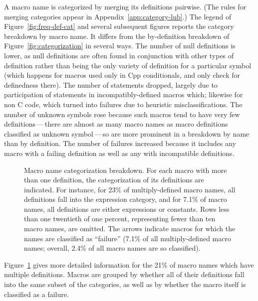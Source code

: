 \documentclass[10pt]{article}
\newcommand{\captionsmall}[1]{\caption[]{\small #1}}
\begin{document}
A macro name is categorized by merging its definitions pairwise.  (The
rules for merging categories appear in Appendix~\ref{app:category-lub}.)
The legend of Figure~\ref{fig:freq-def-cat} and several subsequent figures
reports the category breakdown by macro name.  It differs from the
by-definition breakdown of Figure~\ref{fig:categorization} in several ways.
The number of null definitions is lower, as null definitions are often
found in conjunction with other types of definition rather than being the
only variety of definition for a particular symbol (which happens for
macros used only in Cpp conditionals, and only check for definedness
there).  The number of statements dropped, largely due to participation of
statements in incompatibly-defined macros which; likewise for non C code,
which turned into failures due to heuristic misclassifications.  The number
of unknown symbols rose because such macros tend to have very few
definitions\,---\,there are almost as many macro names as macro definitions
classified as unknown symbol\,---\,so are more prominent in a breakdown by
name than by definition.  The number of failures increased because it
includes any macro with a failing definition as well as any with
incompatible definitions.


\begin{figure}
  {\small\centerline{}}
  
  \captionsmall{Macro name categorization breakdown.  For each macro with more
    than one definition, the categorization of its definitions are
    indicated.  For instance, for 23\% of multiply-defined macro names, all
    definitions fall into the expression category, and for 7.1\% of macro
    names, all definitions are either expressions or constants.  Rows less
    than one twentieth of one percent, representing fewer than ten macro
    names, are omitted.  The arrows indicate macros for which the names
    are classified as ``failure'' (7.1\% of all multiply-defined macro
    names; overall, 2.4\% of all macro names are so classified).}

  \label{fig:subset-categories}
\end{figure}

Figure~\ref{fig:subset-categories} gives more detailed information for the
21\% of macro names which have multiple definitions.  Macros are grouped by
whether all of their definitions fall into the same subset of the
categories, as well as by whether the macro itself is classified as a
failure.
\end{document}
